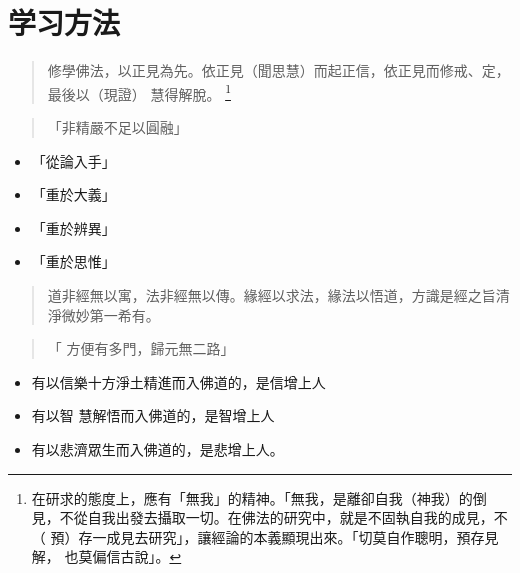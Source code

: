 \section{学习方法}

\begin{quote}
  修學佛法，以正見為先。依正見（聞思慧）而起正信，依正見而修戒、定，最後以（現證） 慧得解脫。
  \footnote{在研求的態度上，應有「無我」的精神。「無我，是離卻自我（神我）的倒 見，不從自我出發去攝取一切。在佛法的研究中，就是不固執自我的成見，不（ 預）存一成見去研究」，讓經論的本義顯現出來。「切莫自作聰明，預存見解， 也莫偏信古說」。}
\end{quote}

\begin{quote}
  「非精嚴不足以圓融」
\end{quote}

\begin{itemize}
  \item 「從論入手」
  \item 「重於大義」
  \item 「重於辨異」
  \item 「重於思惟」
\end{itemize}

\begin{quote}
  道非經無以寓，法非經無以傳。緣經以求法，緣法以悟道，方識是經之旨清淨微妙第一希有。
\end{quote}

\begin{quote}
  「 方便有多門，歸元無二路」
\end{quote}

\begin{itemize}
  \item 有以信樂十方淨土精進而入佛道的，是信增上人
  \item 有以智 慧解悟而入佛道的，是智增上人
  \item 有以悲濟眾生而入佛道的，是悲增上人。
\end{itemize}
